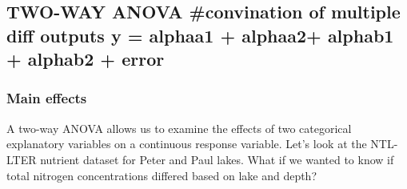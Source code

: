 \documentclass[]{article}
\newenvironment{Shaded}{\begin{snugshade}}{\end{snugshade}}
\newcommand{\KeywordTok}[1]{\textcolor[rgb]{0.13,0.29,0.53}{\textbf{#1}}}
\newcommand{\StringTok}[1]{\textcolor[rgb]{0.31,0.60,0.02}{#1}}
\newcommand{\CommentTok}[1]{\textcolor[rgb]{0.56,0.35,0.01}{\textit{#1}}}
\newcommand{\OperatorTok}[1]{\textcolor[rgb]{0.81,0.36,0.00}{\textbf{#1}}}
\newcommand{\NormalTok}[1]{#1}
\begin{document}
\subsection{TWO-WAY ANOVA \#convination of multiple diff outputs y =
alphaa1 + alphaa2+ alphab1 + alphab2 +
error}\label{two-way-anova-convination-of-multiple-diff-outputs-y-alphaa1-alphaa2-alphab1-alphab2-error}

\subsubsection{Main effects}\label{main-effects}

A two-way ANOVA allows us to examine the effects of two categorical
explanatory variables on a continuous response variable. Let's look at
the NTL-LTER nutrient dataset for Peter and Paul lakes. What if we
wanted to know if total nitrogen concentrations differed based on lake
and depth?

\begin{Shaded}
\end{Shaded}
\end{document}
